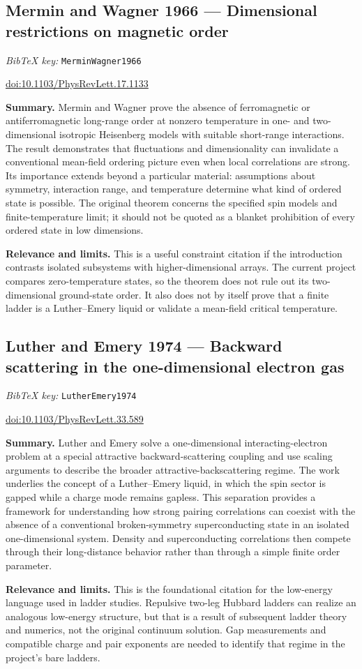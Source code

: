 \documentclass[11pt]{article}
\newcommand{\paper}[2]{\Needspace{8\baselineskip}\subsection{#2}\label{paper:#1}\textit{BibTeX key:} \texttt{#1}\quad\citep{#1}\par}
\newcommand{\doi}[1]{\href{https://doi.org/#1}{doi:#1}}
\newcommand{\summary}{\par\textbf{Summary.} }
\newcommand{\relevance}{\par\textbf{Relevance and limits.} }
\begin{document}
\paper{MerminWagner1966}{Mermin and Wagner 1966 --- Dimensional restrictions on magnetic order}
\doi{10.1103/PhysRevLett.17.1133}
\summary Mermin and Wagner prove the absence of ferromagnetic or antiferromagnetic long-range order at nonzero temperature in one- and two-dimensional isotropic Heisenberg models with suitable short-range interactions. The result demonstrates that fluctuations and dimensionality can invalidate a conventional mean-field ordering picture even when local correlations are strong. Its importance extends beyond a particular material: assumptions about symmetry, interaction range, and temperature determine what kind of ordered state is possible. The original theorem concerns the specified spin models and finite-temperature limit; it should not be quoted as a blanket prohibition of every ordered state in low dimensions.
\relevance This is a useful constraint citation if the introduction contrasts isolated subsystems with higher-dimensional arrays. The current project compares zero-temperature states, so the theorem does not rule out its two-dimensional ground-state order. It also does not by itself prove that a finite ladder is a Luther--Emery liquid or validate a mean-field critical temperature.

\paper{LutherEmery1974}{Luther and Emery 1974 --- Backward scattering in the one-dimensional electron gas}
\doi{10.1103/PhysRevLett.33.589}
\summary Luther and Emery solve a one-dimensional interacting-electron problem at a special attractive backward-scattering coupling and use scaling arguments to describe the broader attractive-backscattering regime. The work underlies the concept of a Luther--Emery liquid, in which the spin sector is gapped while a charge mode remains gapless. This separation provides a framework for understanding how strong pairing correlations can coexist with the absence of a conventional broken-symmetry superconducting state in an isolated one-dimensional system. Density and superconducting correlations then compete through their long-distance behavior rather than through a simple finite order parameter.
\relevance This is the foundational citation for the low-energy language used in ladder studies. Repulsive two-leg Hubbard ladders can realize an analogous low-energy structure, but that is a result of subsequent ladder theory and numerics, not the original continuum solution. Gap measurements and compatible charge and pair exponents are needed to identify that regime in the project's bare ladders.
\end{document}
